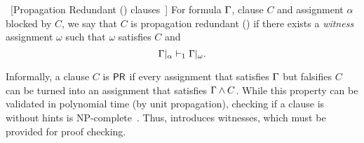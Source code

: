 

\begin{definition}~\label{def:pr}[Propagation Redundant (\pr) clauses~\cite{prclauses}]
    For formula $\Gamma$, clause $C$ and assignment $\alpha$ blocked by $C$,
    we say that $C$ is propagation redundant
    (\pr) if there exists a \emph{witness} assignment $\omega$ such that
    $\omega$ satisfies $C$ and
$$
    \Gamma|_\alpha \vdash_1 \Gamma|_\omega.
$$
\end{definition}





Informally, a clause $C$ is $\textsf{PR}$ if every assignment that satisfies
$\Gamma$ but falsifies $C$ can be turned into an assignment that satisfies
$\Gamma \land C$. While this property can be validated in polynomial time
(by unit propagation), checking if a clause is \pr
without hints is NP-complete~\cite{prclauses}. Thus, \pr introduces witnesses,
which must be provided for proof checking.  



